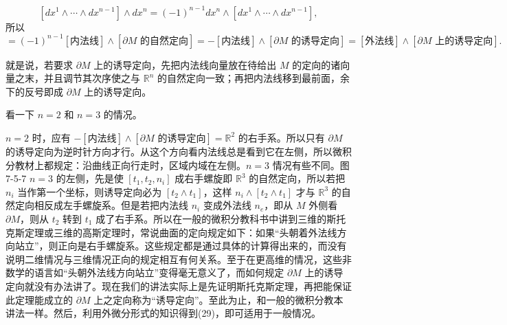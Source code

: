 \[
 [dx^1\wedge\cdots\wedge dx^{n-1}]\wedge dx^n
 =(-1)^{n-1}dx^n\wedge[dx^1\wedge\cdots\wedge dx^{n-1}],
\]
所以
\begin{equation}
 [\mathbb R^n\text{ 的自然定向}]
 =(-1)^{n-1}[\text{内法线}]\wedge[\partial M\text{ 的自然定向}]
 =-[\text{内法线}]\wedge[\partial M\text{ 的诱导定向}]
 =[\text{外法线}]\wedge[\partial M\text{ 上的诱导定向}].
 \tag{29}
\end{equation}

就是说，若要求 $\partial M$ 上的诱导定向，先把内法线向量放在待给出 $M$ 的定向的诸向量之末，并且调节其次序使之与 $\mathbb R^n$ 的自然定向一致；再把内法线移到最前面，余下的反号即成 $\partial M$ 上的诱导定向。

看一下 $n=2$ 和 $n=3$ 的情况。

$n=2$ 时，应有 $-[\text{内法线}]\wedge[\partial M\text{ 的诱导定向}]=\mathbb R^2$ 的右手系。所以只有 $\partial M$ 的诱导定向为逆时针方向才行。从这个方向看内法线总是看到它在左侧，所以微积分教材上都规定：沿曲线正向行走时，区域内域在左侧。$n=3$ 情况有些不同。图7-5-7 $n=3$ 的左侧，先是使 $[t_1,t_2,n_i]$ 成右手螺旋即 $\mathbb R^3$ 的自然定向，所以若把 $n_i$ 当作第一个坐标，则诱导定向必为 $[t_2\wedge t_1]$，这样 $n_i\wedge[t_2\wedge t_1]$ 才与 $\mathbb R^3$ 的自然定向相反成左手螺旋系。但是若把内法线 $n_i$ 变成外法线 $n_e$，即从 $M$ 外侧看 $\partial M$，则从 $t_2$ 转到 $t_1$ 成了右手系。所以在一般的微积分教科书中讲到三维的斯托克斯定理或三维的高斯定理时，常说曲面的定向规定如下：如果“头朝着外法线方向站立”，则正向是右手螺旋系。这些规定都是通过具体的计算得出来的，而没有说明二维情况与三维情况正向的规定相互有何关系。至于在更高维的情况，这些非数学的语言如“头朝外法线方向站立”变得毫无意义了，而如何规定 $\partial M$ 上的诱导定向就没有办法讲了。现在我们的讲法实际上是先证明斯托克斯定理，再把能保证此定理能成立的 $\partial M$ 上之定向称为“诱导定向”。至此为止，和一般的微积分教本讲法一样。然后，利用外微分形式的知识得到(29)，即可适用于一般情况。

